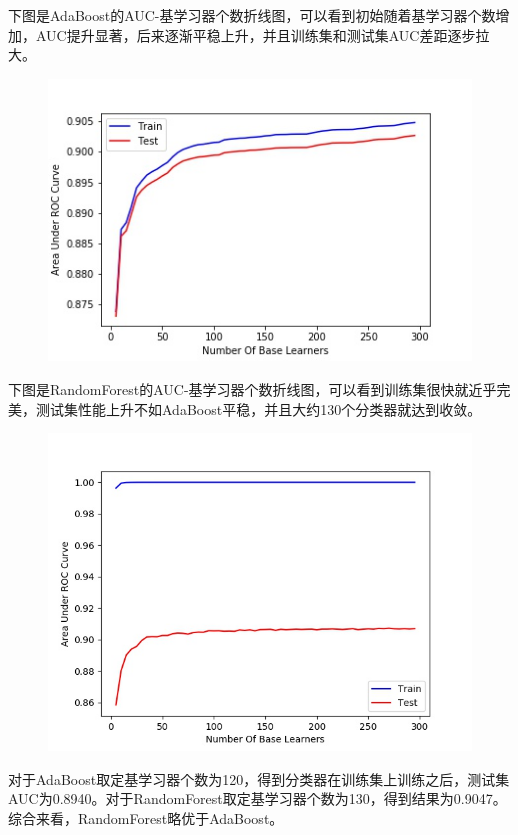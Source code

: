 \documentclass[a4paper,UTF8]{article}
\theoremstyle{definition}
\begin{document}
下图是AdaBoost的AUC-基学习器个数折线图，可以看到初始随着基学习器个数增加，AUC提升显著，后来逐渐平稳上升，并且训练集和测试集AUC差距逐步拉大。
\begin{figure}[H]
	\centering
	\includegraphics[scale=0.6]{adaboost.jpg}
\end{figure}
下图是RandomForest的AUC-基学习器个数折线图，可以看到训练集很快就近乎完美，测试集性能上升不如AdaBoost平稳，并且大约130个分类器就达到收敛。
\begin{figure}[H]
	\centering
	\includegraphics[scale=0.6]{randomforest.jpg}
\end{figure}
对于AdaBoost取定基学习器个数为120，得到分类器在训练集上训练之后，测试集AUC为0.8940。对于RandomForest取定基学习器个数为130，得到结果为0.9047。综合来看，RandomForest略优于AdaBoost。
\end{document}
